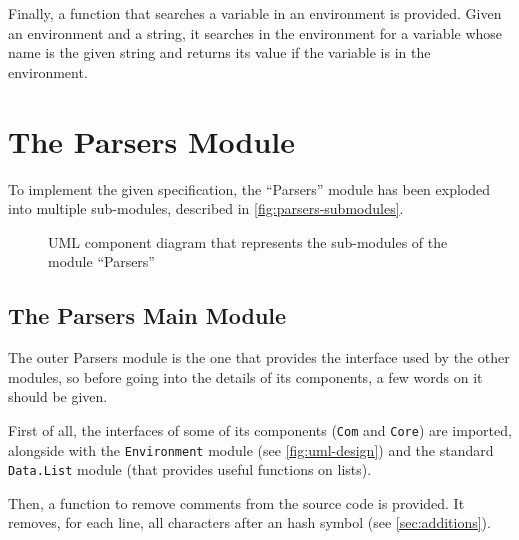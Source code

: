 \documentclass{esposito-documentation}
\begin{document}
Finally, a function that searches a variable in an environment is provided.
Given an environment and a string, it searches in the environment for a
variable whose name is the given string and returns its value if the variable
is in the environment.



\section{The Parsers Module}

To implement the given specification, the ``Parsers'' module has
been exploded into multiple sub-modules, described in
\autoref{fig:parsers-submodules}.

\begin{figure}[H]
	\centering
	\caption{UML component diagram that represents the sub-modules of the module ``Parsers''}
	\label{fig:parsers-submodules}
\end{figure}

\subsection{The Parsers Main Module}


The outer Parsers module is the one that provides the interface used by the
other modules, so before going into the details of its components, a few words
on it should be given.

First of all, the interfaces of some of its components (\texttt{Com} and
\texttt{Core}) are imported, alongside with the \texttt{Environment} module
(see \autoref{fig:uml-design}) and the standard \texttt{Data.List} module (that
provides useful functions on lists).



Then, a function to remove comments from the source code is provided. It removes, for each line, all characters after an hash symbol (see \autoref{sec:additions}).
\end{document}
